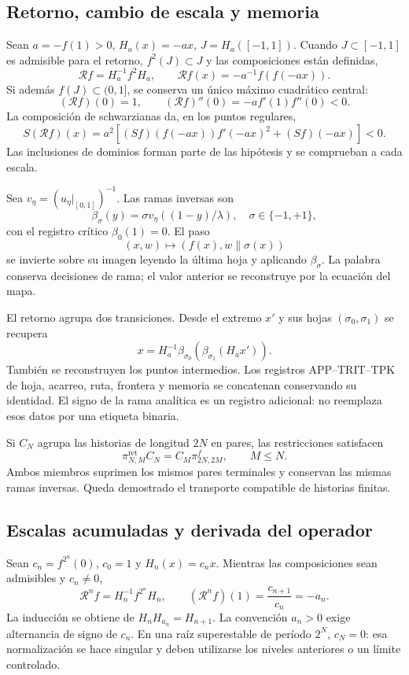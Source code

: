 \subsection{Retorno, cambio de escala y memoria}
\label{hmtfg:desarrollo:5}

Sean \(a=-f(1)>0\), \(H_a(x)=-ax\), \(J=H_a([-1,1])\). Cuando \(J\subset[-1,1]\) es admisible para el retorno, \(f^2(J)\subset J\) y las composiciones están definidas,
\[
\mathcal Rf=H_a^{-1}f^2H_a,\qquad
\mathcal Rf(x)=-a^{-1}f(f(-ax)).
\]
Si además \(f(J)\subset(0,1]\), se conserva un único máximo cuadrático central:
\[
(\mathcal Rf)(0)=1,\qquad
(\mathcal Rf)''(0)=-a f'(1)f''(0)<0.
\]
La composición de schwarzianas da, en los puntos regulares,
\[
S(\mathcal Rf)(x)=a^2
\left[(Sf)(f(-ax))f'(-ax)^2+(Sf)(-ax)\right]<0.
\]
Las inclusiones de dominios forman parte de las hipótesis y se comprueban a cada escala.

Sea \(v_\eta=(u_\eta|_{[0,1]})^{-1}\). Las ramas inversas son
\[
\beta_\sigma(y)=\sigma v_\eta((1-y)/\lambda),\quad
\sigma\in\{-1,+1\},
\]
con el registro crítico \(\beta_0(1)=0\). El paso
\[
(x,w)\longmapsto(f(x),w\mathbin{\|}\sigma(x))
\]
se invierte sobre su imagen leyendo la última hoja y aplicando \(\beta_\sigma\). La palabra conserva decisiones de rama; el valor anterior se reconstruye por la ecuación del mapa.

El retorno agrupa dos transiciones. Desde el extremo \(x'\) y sus hojas \((\sigma_0,\sigma_1)\) se recupera
\[
x=H_a^{-1}\beta_{\sigma_0}
\!\left(\beta_{\sigma_1}(H_ax')\right).
\]
También se reconstruyen los puntos intermedios. Los registros APP–TRIT–TPK de hoja, acarreo, ruta, frontera y memoria se concatenan conservando su identidad. El signo de la rama analítica es un registro adicional: no reemplaza esos datos por una etiqueta binaria.

Si \(C_N\) agrupa las historias de longitud \(2N\) en pares, las restricciones satisfacen
\[
\pi^{\mathrm{ret}}_{N,M}C_N
=C_M\pi^f_{2N,2M},\qquad M\le N.
\]
Ambos miembros suprimen los mismos pares terminales y conservan las mismas ramas inversas. Queda demostrado el transporte compatible de historias finitas.


\subsection{Escalas acumuladas y derivada del operador}
\label{hmtfg:desarrollo:6}

Sean \(c_n=f^{2^n}(0)\), \(c_0=1\) y \(H_n(x)=c_nx\). Mientras las composiciones sean admisibles y \(c_n\ne0\),
\[
\boxed{\mathcal R^nf=H_n^{-1}f^{2^n}H_n},\qquad
(\mathcal R^nf)(1)=\frac{c_{n+1}}{c_n}=-a_n.
\]
La inducción se obtiene de \(H_nH_{a_n}=H_{n+1}\). La convención \(a_n>0\) exige alternancia de signo de \(c_n\). En una raíz superestable de período \(2^N\), \(c_N=0\): esa normalización se hace singular y deben utilizarse los niveles anteriores o un límite controlado.

